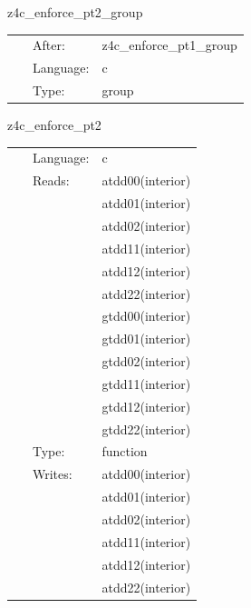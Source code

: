 \vspace{5mm}


\hspace{5mm} z4c\_enforce\_pt2\_group 

\hspace{5mm}{\it group for function `z4c\_enforce\_pt2`. generated by einsteinengine. } 


\hspace{5mm}

 \begin{tabular*}{160mm}{cll} 
~ & After:  & z4c\_enforce\_pt1\_group \\ 
~ & Language:  & c \\ 
~ & Type:  & group \\ 
\end{tabular*} 


\vspace{5mm}


\hspace{5mm} z4c\_enforce\_pt2 

\hspace{5mm}{\it function `z4c\_enforce\_pt2` generated by einsteinengine. } 


\hspace{5mm}

 \begin{tabular*}{160mm}{cll} 
~ & Language:  & c \\ 
~ & Reads:  & atdd00(interior) \\ 
~& ~ &atdd01(interior)\\ 
~& ~ &atdd02(interior)\\ 
~& ~ &atdd11(interior)\\ 
~& ~ &atdd12(interior)\\ 
~& ~ &atdd22(interior)\\ 
~& ~ &gtdd00(interior)\\ 
~& ~ &gtdd01(interior)\\ 
~& ~ &gtdd02(interior)\\ 
~& ~ &gtdd11(interior)\\ 
~& ~ &gtdd12(interior)\\ 
~& ~ &gtdd22(interior)\\ 
~ & Type:  & function \\ 
~ & Writes:  & atdd00(interior) \\ 
~& ~ &atdd01(interior)\\ 
~& ~ &atdd02(interior)\\ 
~& ~ &atdd11(interior)\\ 
~& ~ &atdd12(interior)\\ 
~& ~ &atdd22(interior)\\ 
\end{tabular*} 


